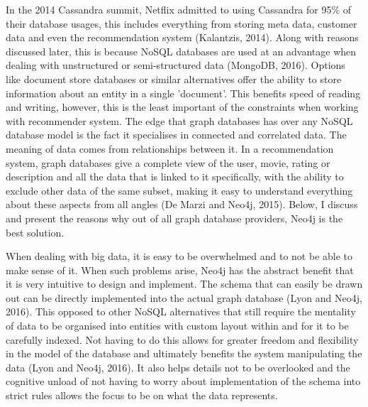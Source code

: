 \documentclass[a4paper]{article}
\begin{document}
In the 2014 Cassandra summit, Netflix admitted to using Cassandra for 95\% of their database usages, this includes everything from storing meta data, customer data and even the recommendation system (Kalantzis, 2014). Along with reasons discussed later, this is because NoSQL databases are used at an advantage when dealing with unstructured or semi-structured data (MongoDB, 2016). Options like document store databases or similar alternatives offer the ability to store information about an entity in a single 'document'. This benefits speed of reading and writing, however, this is the least important of the constraints when working with recommender system. The edge that graph databases has over any NoSQL database model is the fact it specialises in connected and correlated data. The meaning of data comes from relationships between it. In a recommendation system, graph databases give a complete view of the user, movie, rating or description and all the data that is linked to it specifically, with the ability to exclude other data of the same subset, making it easy to understand everything about these aspects from all angles (De Marzi and Neo4j, 2015). Below, I discuss and present the reasons why out of all graph database providers, Neo4j is the best solution. \par

When dealing with big data, it is easy to be overwhelmed and to not be able to make sense of it. When such problems arise, Neo4j has the abstract benefit that it is very intuitive to design and implement. The schema that can easily be drawn out can be directly implemented into the actual graph database (Lyon and Neo4j, 2016). This opposed to other NoSQL alternatives that still require the mentality of data to be organised into entities with custom layout within and for it to be carefully indexed. Not having to do this allows for greater freedom and flexibility in the model of the database and ultimately benefits the system manipulating the data (Lyon and Neo4j, 2016). It also helps details not to be overlooked and the cognitive unload of not having to worry about implementation of the schema into strict rules allows the focus to be on what the data represents.\par
\end{document}
